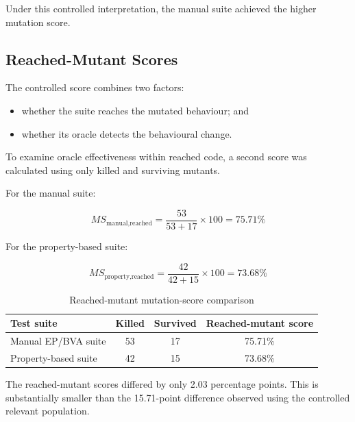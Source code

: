 \documentclass[12pt]{article}
\begin{document}
Under this controlled interpretation, the manual suite achieved the higher
mutation score.

\subsection{Reached-Mutant Scores}

The controlled score combines two factors:

\begin{itemize}
    \item whether the suite reaches the mutated behaviour; and
    \item whether its oracle detects the behavioural change.
\end{itemize}

To examine oracle effectiveness within reached code, a second score was
calculated using only killed and surviving mutants.

For the manual suite:

\begin{equation}
MS_{\text{manual,reached}}
=
\frac{53}{53+17}\times 100
=
75.71\%
\end{equation}

For the property-based suite:

\begin{equation}
MS_{\text{property,reached}}
=
\frac{42}{42+15}\times 100
=
73.68\%
\end{equation}

\begin{table}[H]
\centering
\caption{Reached-mutant mutation-score comparison}
\label{tab:reached-mutation-score}

\begin{tabular}{|p{5cm}|c|c|c|}
\hline
\textbf{Test suite} &
\textbf{Killed} &
\textbf{Survived} &
\textbf{Reached-mutant score} \\
\hline

Manual EP/BVA suite &
53 &
17 &
75.71\% \\
\hline

Property-based suite &
42 &
15 &
73.68\% \\
\hline

\end{tabular}
\end{table}

The reached-mutant scores differed by only 2.03 percentage points. This is
substantially smaller than the 15.71-point difference observed using the
controlled relevant population.
\end{document}
